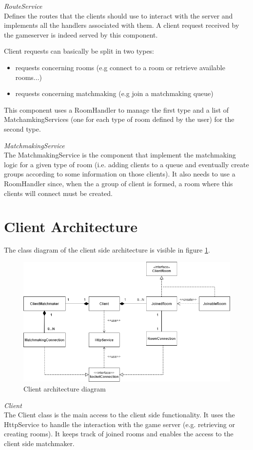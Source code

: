 \bigskip
\textit{RouteService}
\\
Defines the routes that the clients should use to interact with the server and implements all the handlers associated with them. A client request received by the gameserver is indeed served by this component. 

Client requests can basically be split in two types:
\begin{itemize}
	\item requests concerning rooms (e.g connect to a room or retrieve available rooms...)
	\item requests concerning matchmaking (e.g join a matchmaking queue)
\end{itemize}
This component uses a RoomHandler to manage the first type and a list of MatchamkingServices (one for each type of room defined by the user) for the second type. 

\bigskip
\textit{MatchmakingService}
\\
The MatchmakingService is the component that implement the matchmaking logic for a given type of room (i.e. adding clients to a queue and eventually create groups according to some information on those clients). It also needs to use a RoomHandler since, when the a group of client is formed, a room where this clients will connect must be created.



\section{Client Architecture}

The class diagram of the client side architecture is visible in figure \ref{fig:client_architecture}. 
\begin{figure}[H]
	\centering
	\includegraphics[scale=0.65]{images/3-architecture/client-architecture.png}
	\caption{Client architecture diagram}
	\label{fig:client_architecture}
\end{figure}
\bigskip
\textit{Client}
\\
The Client class is the main access to the client side functionality.
It uses the HttpService to handle the interaction with the game server (e.g. retrieving or creating rooms).
It keeps track of joined rooms and enables the access to the client side matchmaker.

